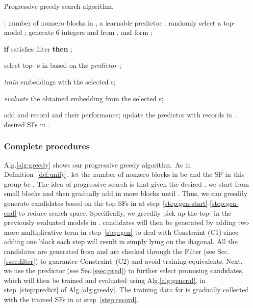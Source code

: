 \documentclass[conference]{IEEEtran}
\begin{document}
\begin{algorithm}[ht]
	\caption{Progressive greedy search algorithm.}
	\label{alg:greedy}
	\small
	\begin{algorithmic}[1]
		\REQUIRE : number of nonzero blocks in , a learnable predictor ;
		\REPEAT	 \label{step:gen-start}
		\STATE randomly select a top- model ; 
		\STATE generate 6 integers  and  from , 
		and form
		;
		\label{step:gen}
		
		\STATE \textbf{if}  satisfies filter  \textbf{then} ;
\label{step:filter}
		\UNTIL{}  \label{step:gen-end}

		{
		\STATE select top- s in  based on the \textit{predictor} ;
		\label{step:predict}
		
		\STATE \textit{train} embeddings with the selected s;
		
		\STATE \textit{evaluate} the obtained embedding from the selected s;	
		}
		
		\STATE  add and record  and their performance;
		\label{step:record}
\label{step:top}
		\STATE update the predictor  with records in . 
		\label{step:update} 
		\ENDFOR
		\RETURN desired SFs in .
	\end{algorithmic}
\end{algorithm}

\subsubsection{Complete procedures}
Alg.\ref{alg:greedy} shows our progressive greedy algorithm.
As in Definition~\ref{def:unify},
let the number of 
nonzero blocks in  be 
and the SF in this group be .
The idea of progressive search is that
given the desired ,
we start from small blocks  and then gradually add in more blocks until .
Thus, 
we can greedily generate candidates based on the top SFs in  at step~\ref{step:gen-start}-\ref{step:gen-end}
to reduce search space.
Specifically, we greedily pick up the top-  in the previously evaluated models in .
 candidates
will then be generated by adding two more multiplicative term in step~\ref{step:gen}
to deal with Constraint (C1)
since adding one block each step will result in simply lying on the diagonal.
All the candidates are generated from  
and are checked through the Filter  (see Sec.\ref{ssec:filter}) to guarantee Constraint~(C2)
and avoid training equivalents.
Next,
we use the predictor  (see Sec.\ref{ssec:pred}) to further select  promising candidates,
which will then be trained and evaluated using Alg.\ref{alg:general},
in 
step~\ref{step:predict} of Alg.\ref{alg:greedy}.
The training data for  is gradually collected with the trained SFs in  at step~\ref{step:record}.
\end{document}
